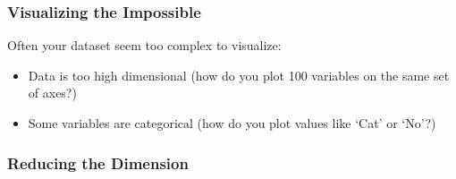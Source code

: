\documentclass[12pt,t]{beamer}
\begin{document}
\begin{frame}
  \frametitle{Visualizing the Impossible}
  Often your dataset seem too complex to visualize:
  \vskip0.2cm
  \begin{itemize}
  \item Data is too high dimensional (how do you plot 100 variables on the same set of axes?)
  \item Some variables are categorical (how do you plot values like `Cat' or `No'?)
  \end{itemize}
  \end{frame}

\begin{frame}
  \frametitle{Reducing the Dimension}
  
\end{frame}
\end{document}
